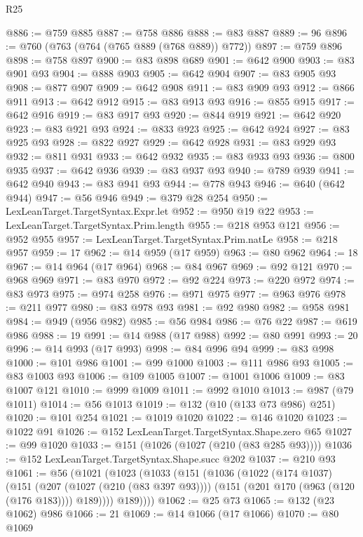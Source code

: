 \begin{lexlean}{R25}
\begin{coremodule}
@886 := @759 @885
@887 := @758 @886
@888 := @83 @887
@889 := 96
@896 := @760 (@763 (@764 (@765 @889 (@768 @889)) @772))
@897 := @759 @896
@898 := @758 @897
@900 := @83 @898 @689
@901 := @642 @900
@903 := @83 @901 @93
@904 := @888 @903
@905 := @642 @904
@907 := @83 @905 @93
@908 := @877 @907
@909 := @642 @908
@911 := @83 @909 @93
@912 := @866 @911
@913 := @642 @912
@915 := @83 @913 @93
@916 := @855 @915
@917 := @642 @916
@919 := @83 @917 @93
@920 := @844 @919
@921 := @642 @920
@923 := @83 @921 @93
@924 := @833 @923
@925 := @642 @924
@927 := @83 @925 @93
@928 := @822 @927
@929 := @642 @928
@931 := @83 @929 @93
@932 := @811 @931
@933 := @642 @932
@935 := @83 @933 @93
@936 := @800 @935
@937 := @642 @936
@939 := @83 @937 @93
@940 := @789 @939
@941 := @642 @940
@943 := @83 @941 @93
@944 := @778 @943
@946 := @640 (@642 @944)
@947 := @56 @946
@949 := @379 @28 @254
@950 := LexLeanTarget.TargetSyntax.Expr.let
@952 := @950 @19 @22
@953 := LexLeanTarget.TargetSyntax.Prim.length
@955 := @218 @953 @121
@956 := @952 @955
@957 := LexLeanTarget.TargetSyntax.Prim.natLe
@958 := @218 @957
@959 := 17
@962 := @14 @959 (@17 @959)
@963 := @80 @962
@964 := 18
@967 := @14 @964 (@17 @964)
@968 := @84 @967
@969 := @92 @121
@970 := @968 @969
@971 := @83 @970
@972 := @92 @224
@973 := @220 @972
@974 := @83 @973
@975 := @974 @258
@976 := @971 @975
@977 := @963 @976
@978 := @211 @977
@980 := @83 @978 @93
@981 := @92 @980
@982 := @958 @981
@984 := @949 (@956 @982)
@985 := @56 @984
@986 := @76 @22
@987 := @619 @986
@988 := 19
@991 := @14 @988 (@17 @988)
@992 := @80 @991
@993 := 20
@996 := @14 @993 (@17 @993)
@998 := @84 @996 @94
@999 := @83 @998
@1000 := @101 @986
@1001 := @99 @1000
@1003 := @111 @986 @93
@1005 := @83 @1003 @93
@1006 := @109 @1005
@1007 := @1001 @1006
@1009 := @83 @1007 @121
@1010 := @999 @1009
@1011 := @992 @1010
@1013 := @987 (@79 @1011)
@1014 := @56 @1013
@1019 := @132 (@10 (@133 @73 @986) @251)
@1020 := @101 @254
@1021 := @1019 @1020
@1022 := @146 @1020
@1023 := @1022 @91
@1026 := @152 LexLeanTarget.TargetSyntax.Shape.zero @65
@1027 := @99 @1020
@1033 := @151 (@1026 (@1027 (@210 (@83 @285 @93))))
@1036 := @152 LexLeanTarget.TargetSyntax.Shape.succ @202
@1037 := @210 @93
@1061 := @56
    (@1021
      (@1023
        (@1033
          (@151
            (@1036
              (@1022
                (@174 @1037)
                (@151
                  (@207 (@1027 (@210 (@83 @397 @93))))
                  (@151 (@201 @170 (@963 (@120 (@176 @183)))) @189))))
            @189))))
@1062 := @25 @73
@1065 := @132 (@23 @1062) @986
@1066 := 21
@1069 := @14 @1066 (@17 @1066)
@1070 := @80 @1069

\end{coremodule}
\end{lexlean}
